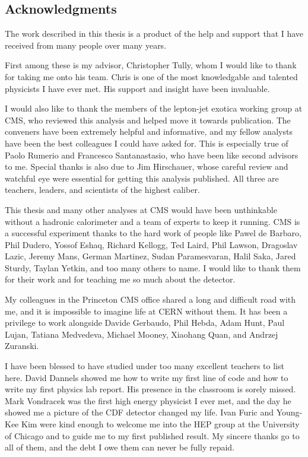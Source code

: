 \begin{singlespace} %
\chapter*{Acknowledgments}

The work described in this thesis is a product 
of the help and support that I have received from many
people over many years.

First among these is my advisor, Christopher Tully, whom I 
would like to thank for taking me onto his team.
Chris is one of the most knowledgable and talented physicists
I have ever met.  His support and insight have been invaluable.

I would also like to thank the members of the lepton-jet
exotica working group at CMS, who reviewed this analysis and helped
move it towards publication.  The conveners have been extremely
helpful and informative, and my fellow analysts have been the 
best colleagues I could have asked for.  This is especially true
of Paolo Rumerio and Francesco Santanastasio, who have been like
second advisors to me. 
Special thanks is also due to Jim Hirschauer, whose careful
review and watchful eye were essential for getting this analysis published.
All three are teachers, leaders, and scientists of the highest caliber.

This thesis and many other analyses at CMS would have been unthinkable without
a hadronic calorimeter and a team of experts to keep it
running.  CMS is a successful experiment thanks to the hard work of people like
Pawel de Barbaro, Phil Dudero, Yossof Eshaq, Richard Kellogg, Ted Laird,
Phil Lawson,  Dragoslav Lazic, Jeremy Mans, German Martinez, 
Sudan Paramesvaran, Halil Saka, Jared Sturdy, Taylan Yetkin, 
and too many others to name.  I would like to thank them for their work and for teaching me
so much about the detector.

My colleagues in the Princeton CMS office shared a long and difficult road
with me, and it is impossible to imagine life at CERN without them.
It has been a privilege to work alongside Davide Gerbaudo, 
Phil Hebda, Adam Hunt, Paul Lujan, Tatiana Medvedeva, Michael Mooney, 
Xiaohang Quan, and Andrzej Zuranski.  

I have been blessed to have studied under too many excellent teachers to list here.
David Dannels showed me how to write my first line of code and how to 
write my first physics lab report.  His presence in the classroom is sorely missed.
Mark Vondracek was the first high energy physicist I ever met, and the day
he showed me a picture of the CDF detector changed my life.
Ivan Furic and Young-Kee Kim were kind enough
to welcome me into the HEP group at the University of Chicago
and to guide me to my first published result.
My sincere thanks go to all of them, and the 
debt I owe them can never be fully repaid.


\end{singlespace}
